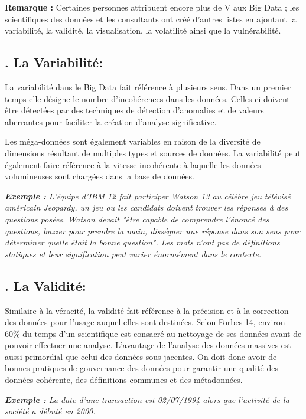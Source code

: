 \textbf{Remarque :} Certaines personnes attribuent encore plus de V aux Big Data ; les scientifiques des données et les consultants ont créé d'autres listes en ajoutant la variabilité, la validité, la visualisation, la volatilité ainsi que la vulnérabilité.

\subsection*{. La Variabilité:}
La variabilité dans le Big Data fait référence à plusieurs sens. Dans un premier temps elle désigne le nombre d'incohérences dans les données. Celles-ci doivent être détectées par des techniques de détection d'anomalies et de valeurs aberrantes pour faciliter la création d'analyse significative. 

Les méga-données sont également variables en raison de la diversité de dimensions résultant de multiples types et sources de données. La variabilité peut également faire référence à la vitesse incohérente à laquelle les données volumineuses sont chargées dans la base de données.

\textit{\textbf{Exemple :} L'équipe d'IBM 12 fait participer Watson 13 au célèbre jeu télévisé américain Jeopardy, un jeu ou les candidats doivent trouver les réponses à des questions posées. Watson devait "être capable de comprendre l'énoncé des questions, buzzer pour prendre la main, disséquer une réponse dans son sens pour déterminer quelle était la bonne question". Les mots n'ont pas de définitions statiques et leur signification peut varier énormément dans le contexte.}

\subsection*{. La Validité:}
Similaire à la véracité, la validité fait référence à la précision et à la correction des données pour l'usage auquel elles sont destinées. Selon Forbes 14, environ 60\% du temps d'un scientifique est consacré au nettoyage de ses données avant de pouvoir effectuer une analyse. L'avantage de l'analyse des données massives est aussi primordial que celui des données sous-jacentes. On doit donc avoir de bonnes pratiques de gouvernance des données pour garantir une qualité des données cohérente, des définitions communes et des métadonnées.

\textit{\textbf{Exemple :} La date d'une transaction est  02/07/1994 alors que l'activité de la société a débuté en 2000.}

